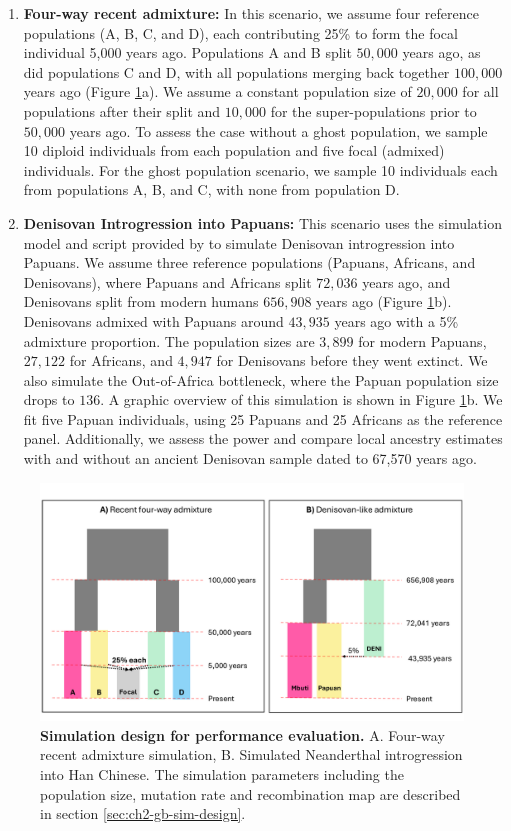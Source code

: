 \begin{enumerate}
    \item \textbf{Four-way recent admixture:} In this scenario, we assume four reference populations (A, B, C, and D), each contributing 25\% to form the focal individual 5,000 years ago. Populations A and B split $50{,}000$ years ago, as did populations C and D, with all populations merging back together $100{,}000$ years ago (Figure \ref{fig:sim1}a). We assume a constant population size of $20{,}000$ for all populations after their split and $10{,}000$ for the super-populations prior to $50{,}000$ years ago. To assess the case without a ghost population, we sample 10 diploid individuals from each population and five focal (admixed) individuals. For the ghost population scenario, we sample 10 individuals each from populations A, B, and C, with none from population D.
    
    \item \textbf{Denisovan Introgression into Papuans:} This scenario uses the simulation model and script provided by \cite{skov2018detecting} to simulate Denisovan introgression into Papuans. We assume three reference populations (Papuans, Africans, and Denisovans), where Papuans and Africans split $72{,}036$ years ago, and Denisovans split from modern humans $656{,}908$ years ago (Figure \ref{fig:sim1}b). Denisovans admixed with Papuans around $43{,}935$ years ago with a 5\% admixture proportion. The population sizes are $3,899$ for modern Papuans, $27{,}122$ for Africans, and $4{,}947$ for Denisovans before they went extinct. We also simulate the Out-of-Africa bottleneck, where the Papuan population size drops to $136$. A graphic overview of this simulation is shown in Figure \ref{fig:sim1}b. We fit five Papuan individuals, using 25 Papuans and 25 Africans as the reference panel. Additionally, we assess the power and compare local ancestry estimates with and without an ancient Denisovan sample dated to 67,570 years ago.
\end{enumerate}

\begin{figure}
    \centering
    \includegraphics[width=\textwidth]{figures/thesis_gb_sim_design.pdf}
    \caption{\textbf{Simulation design for performance evaluation.} A. Four-way recent admixture simulation, B. Simulated Neanderthal introgression into Han Chinese. The simulation parameters including the population size, mutation rate and recombination map are described in section \ref{sec:ch2-gb-sim-design}.}
    \label{fig:sim1}
\end{figure}

